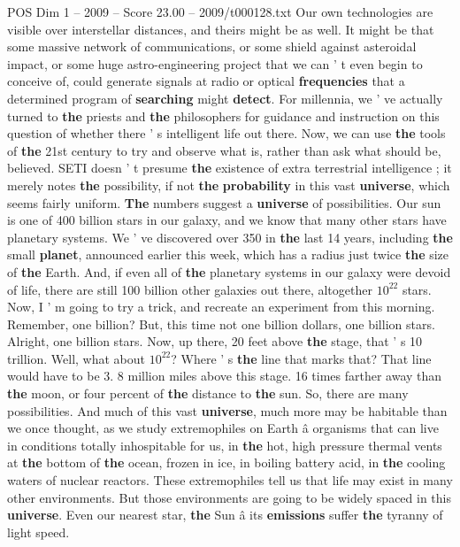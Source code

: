 \begin{textsample}{POS Dim 1 – 2009 – Score 23.00 – 2009/t000128.txt}
Our own technologies are visible over interstellar distances, and theirs might be as well.
It might be that some massive network of communications, or some shield against asteroidal impact, or some huge astro-engineering project that we can ' t even begin to conceive of, could generate signals at radio or optical \textbf{frequencies} that a determined program of \textbf{searching} might \textbf{detect}.
For millennia, we ' ve actually turned to \textbf{the} priests and \textbf{the} philosophers for guidance and instruction on this question of whether there ' s intelligent life out there.
Now, we can use \textbf{the} tools of \textbf{the} 21st century to try and observe what is, rather than ask what should be, believed.
SETI doesn ' t presume \textbf{the} existence of extra terrestrial intelligence ; it merely notes \textbf{the} possibility, if not \textbf{the} \textbf{probability} in this vast \textbf{universe}, which seems fairly uniform. \textbf{The} numbers suggest a \textbf{universe} of possibilities.
Our sun is one of 400 billion stars in our galaxy, and we know that many other stars have planetary systems.
We ' ve discovered over 350 in \textbf{the} last 14 years, including \textbf{the} small \textbf{planet}, announced earlier this week, which has a radius just twice \textbf{the} size of \textbf{the} Earth.
And, if even all of \textbf{the} planetary systems in our galaxy were devoid of life, there are still 100 billion other galaxies out there, altogether $10^{22}$ stars.
Now, I ' m going to try a trick, and recreate an experiment from this morning.
Remember, one billion?
But, this time not one billion dollars, one billion stars.
Alright, one billion stars.
Now, up there, 20 feet above \textbf{the} stage, that ' s 10 trillion.
Well, what about $10^{22}$?
Where ' s \textbf{the} line that marks that?
That line would have to be 3. 8 million miles above this stage. 16 times farther away than \textbf{the} moon, or four percent of \textbf{the} distance to \textbf{the} sun.
So, there are many possibilities.
And much of this vast \textbf{universe}, much more may be habitable than we once thought, as we study extremophiles on Earth â organisms that can live in conditions totally inhospitable for us, in \textbf{the} hot, high pressure thermal vents at \textbf{the} bottom of \textbf{the} ocean, frozen in ice, in boiling battery acid, in \textbf{the} cooling waters of nuclear reactors.
These extremophiles tell us that life may exist in many other environments.
But those environments are going to be widely spaced in this \textbf{universe}.
Even our nearest star, \textbf{the} Sun â its \textbf{emissions} suffer \textbf{the} tyranny of light speed.

\end{textsample}
